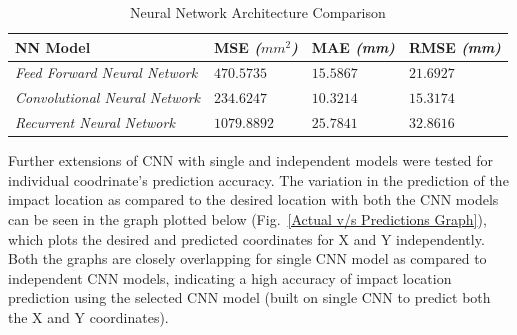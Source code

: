 \documentclass[12pt]{article}
\begin{document}
\begin{table}[h!]
\centering
\begin{tabular}{|m{2.3 in}|m{0.95 in}|m{0.95 in}|m{1 in}|}
\hline
\textbf{NN Model} & \textbf{MSE} \textit{($mm^2$)} & \textbf{MAE} \textit{(mm)} & \textbf{RMSE} \textit{(mm)} \\
\hline
\textit{Feed Forward Neural Network} & $470.5735$ & $15.5867$ & $21.6927$\\
\hline
\textit{Convolutional Neural Network} & $234.6247$ & $10.3214$ & $15.3174$\\
\hline
\textit{Recurrent Neural Network} & $1079.8892$ & $25.7841$ & $32.8616$ \\
\hline
\end{tabular}
\caption{Neural Network Architecture Comparison}
\label{archCompTab}
\end{table}
\pagebreak


\noindent
Further extensions of CNN with single and independent models were tested for individual coodrinate's prediction accuracy. The variation in the prediction of the impact location as compared to the desired location with both the CNN models can be seen in the graph plotted below (Fig.~\ref{Actual v/s Predictions Graph}), which plots the desired and predicted coordinates for X and Y independently. Both the graphs are closely overlapping for single CNN model as compared to independent CNN models, indicating a high accuracy of impact location prediction using the selected CNN model (built on single CNN to predict both the X and Y coordinates).

\end{document}
